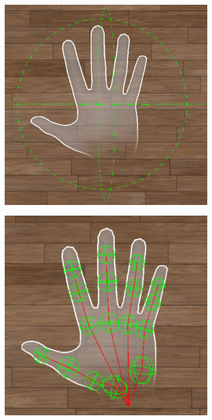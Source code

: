 \documentclass[sigconf,review,anonymous]{acmart}
\begin{document}
\begin{figure}[h]
  \begin{subfigure}{0.48\linewidth} %
    \centering
    \includegraphics[width=\linewidth]{image/bounding-volume.pdf}
    \caption{} %
    \label{fig:bounding-volume}
  \end{subfigure}
  \hfill %
  \begin{subfigure}{0.48\linewidth} %
    \centering
    \includegraphics[width=\linewidth]{image/sphere-tree-model.pdf}

\end{subfigure}
\end{figure}
\end{document}
